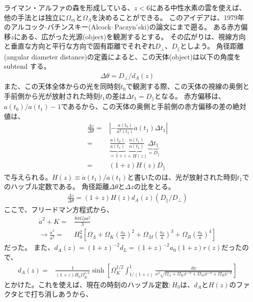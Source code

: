 \documentclass[11pt]{ltjsarticle}
\theoremstyle{plain}
\theoremstyle{break}
\begin{document}
ライマン・アルファの森を形成している、$z<6$にある中性水素の雲を使えば、他の手法とは独立に$\Omega_{m}$と$\Omega_{\Lambda}$を決めることができる。
このアイデアは、1979年のアルコック-バチンスキー(Alcock–Paczyn ́ski)の論文にまで遡る。
ある赤方偏移$z$にある、広がった光源(object)を観測するとする。
その広がりは、視線方向と垂直な方向と平行な方向で固有距離でそれぞれ$D_{\perp}、D_{\parallel}$としよう。
角径距離(angular diameter distance)の定義によると、この天体(object)は以下の角度をsubtend する。
\begin{align}
  \Delta \theta=D_{\perp} / d_{A}(z)
\end{align}%
また、この天体全体からの光を同時刻$t_0$で観測する際、この天体の視線の奥側と手前側から光が放射された時刻$t_1$の差は$\Delta t_{1} = D_{\parallel}$となる。
赤方偏移は、$a(t_0) / a(t_1) -1 $であるから、この天体の奥側と手前側の赤方偏移の差の絶対値は、
\begin{align}
  \frac{\Delta z}{\Delta \theta} 
    =& \left| - \frac{a(t_0)}{a^2(t_1)} \dot{a}(t_1) \Delta t_1 \right| \\
    =& \underbrace{\frac{a(t_0)}{a(t_1)}}_{=1+z}  \underbrace{\frac{\dot{a}(t_1)}{a(t_1)} }_{=H(z)} \underbrace{\Delta t_1}_{=D_{\parallel}}\\
    =& (1+z)H(z) D_{\parallel}
\end{align}%
で与えられる。$H(z) \equiv \dot{a}\left(t_{1}\right) / a\left(t_{1}\right)$と書いたのは、光が放射された時刻$t_1$でのハッブル定数である。
角径距離$\Delta \theta$と$\Delta z$の比をとる。
\begin{align}
  \frac{\Delta z}{\Delta \theta}=(1+z) H(z) d_{A}(z)\left(D_{ \parallel} / D_{\perp}\right)
\end{align}%
ここで、フリードマン方程式から、
\begin{align}
  \dot{a}^2 + K =& \frac{8\pi G \rho a^2}{3}\\
  \rightarrow 
  \frac{\dot{a}^2}{a^2} =& H_0^2  \left[ \Omega_{\Lambda} + \Omega_{K}\left(\frac{a_0}{a}\right)^2 + \Omega_{M} \left(\frac{a_0}{a}\right)^3 +\Omega_{R} \left(\frac{a_0}{a}\right)^4 \right] 
\end{align}
だった。
また、$d_A(z) = (1+z)^{-2} d_{L} = (1+z)^{-2} a_0 (1+z)r(z)$だったので、
\begin{align}
  d_{A}(z)
    =&\frac{1}{(1+z) H_{0} \Omega_{K}^{1 / 2}} \sinh \left[\Omega_{K}^{1 / 2} \int_{1 /(1+z)}^{1} \frac{d x}{x^{2} \sqrt{\Omega_{\Lambda}+\Omega_{K} x^{-2}+\Omega_{M} x^{-3}+\Omega_{R} x^{-4}}}\right]
\end{align}%
とかけた。これを使えば、現在の時刻のハッブル定数$:H_0$は、$d_A$と$H(z)$のファクタとで打ち消しあうから、
\end{document}
